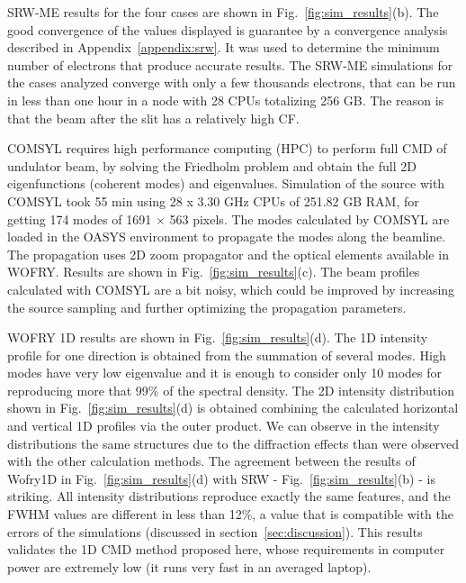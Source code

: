 \documentclass{iucr}              %
\begin{document}
SRW-ME results for the four cases are shown in Fig.~\ref{fig:sim_results}(b). The good convergence of the values displayed is guarantee by a convergence analysis described in Appendix~\ref{appendix:srw}.
It was used to determine the minimum number of electrons that produce accurate results. The SRW-ME simulations for the cases analyzed converge with only a few thousands electrons, that can be run in less than one hour in a node with 28 CPUs totalizing 256 GB. The reason is that the beam after the slit has a relatively high CF. 


COMSYL requires high performance computing (HPC) to perform full CMD of undulator beam, by
solving the Friedholm problem and obtain the full 2D eigenfunctions (coherent modes) and eigenvalues.
Simulation of the source with COMSYL took 55 min using 28 x 3.30 GHz CPUs of 251.82 GB RAM, for getting 174 modes of 1691 $\times$ 563 pixels.
The modes calculated by COMSYL are loaded in the OASYS environment \cite{codeOASYS} to propagate the modes along the beamline.
The propagation uses 2D zoom propagator and the optical elements available in WOFRY. Results are shown in Fig.~\ref{fig:sim_results}(c). 
The beam profiles calculated with COMSYL are a bit noisy, which could be improved by increasing the source sampling and further optimizing the propagation parameters. 


WOFRY 1D results are shown in Fig.~\ref{fig:sim_results}(d). The 1D intensity profile for one direction is obtained from the summation of several modes. High modes have very low eigenvalue and it is enough to consider only 10 modes for reproducing more that 99\% of the spectral density. The 2D intensity distribution shown in Fig.~\ref{fig:sim_results}(d) is obtained combining the calculated horizontal and vertical 1D profiles via the outer product. We can observe in the intensity distributions the same structures due to the diffraction effects than were observed with the other calculation methods. 
The agreement between the results of Wofry1D in Fig.~\ref{fig:sim_results}(d) with SRW - Fig.~\ref{fig:sim_results}(b) - is striking. All intensity distributions reproduce exactly the same features, and the FWHM values are different in less than 12\%, a value that is compatible with the errors of the simulations (discussed in section~\ref{sec:discussion}). This results validates the 1D CMD method proposed here, whose requirements in computer power are extremely low (it runs very fast in an averaged laptop).  
\end{document}
